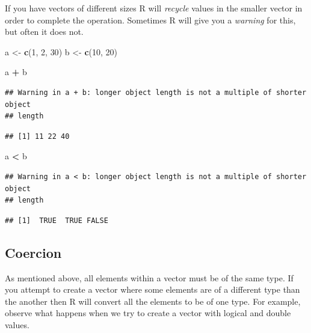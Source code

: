 \documentclass[
]{book}
\newenvironment{Shaded}{\begin{snugshade}}{\end{snugshade}}
\newcommand{\DecValTok}[1]{\textcolor[rgb]{0.00,0.00,0.81}{#1}}
\newcommand{\KeywordTok}[1]{\textcolor[rgb]{0.13,0.29,0.53}{\textbf{#1}}}
\newcommand{\NormalTok}[1]{#1}
\newcommand{\OperatorTok}[1]{\textcolor[rgb]{0.81,0.36,0.00}{\textbf{#1}}}
\newcommand{\StringTok}[1]{\textcolor[rgb]{0.31,0.60,0.02}{#1}}
\begin{document}
If you have vectors of different sizes R will \emph{recycle} values in the smaller vector in order to complete the operation. Sometimes R will give you a \emph{warning} for this, but often it does not.

\begin{Shaded}
\begin{Highlighting}[]
\NormalTok{a <-}\StringTok{ }\KeywordTok{c}\NormalTok{(}\DecValTok{1}\NormalTok{, }\DecValTok{2}\NormalTok{, }\DecValTok{30}\NormalTok{)}
\NormalTok{b <-}\StringTok{ }\KeywordTok{c}\NormalTok{(}\DecValTok{10}\NormalTok{, }\DecValTok{20}\NormalTok{)}

\NormalTok{a }\OperatorTok{+}\StringTok{ }\NormalTok{b}
\end{Highlighting}
\end{Shaded}

\begin{verbatim}
## Warning in a + b: longer object length is not a multiple of shorter object
## length
\end{verbatim}

\begin{verbatim}
## [1] 11 22 40
\end{verbatim}

\begin{Shaded}
\begin{Highlighting}[]
\NormalTok{a }\OperatorTok{<}\StringTok{ }\NormalTok{b}
\end{Highlighting}
\end{Shaded}

\begin{verbatim}
## Warning in a < b: longer object length is not a multiple of shorter object
## length
\end{verbatim}

\begin{verbatim}
## [1]  TRUE  TRUE FALSE
\end{verbatim}

\hypertarget{coercion}{%
\subsection{Coercion}\label{coercion}}

As mentioned above, all elements within a vector must be of the same type. If you attempt to create a vector where some elements are of a different type than the another then R will convert all the elements to be of one type. For example, observe what happens when we try to create a vector with logical and double values.
\end{document}
